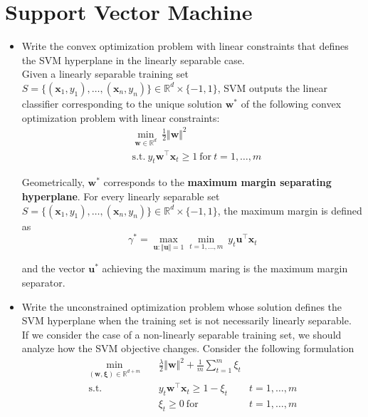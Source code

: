 \newpage
\section{Support Vector Machine}

\begin{itemize}
    
    \item Write the convex optimization problem with linear constraints that defines the SVM hyperplane in the linearly separable case.\\
        
        Given a linearly separable training set $S = \{(\boldsymbol{x}_1, y_1), \dots, (\boldsymbol{x}_n, y_n)\} \in \mathbb{R}^d \times \{-1, 1\}$, SVM outputs the linear classifier corresponding to the unique solution $\boldsymbol{w}^*$ of the following convex optimization problem with linear constraints:
            \begin{align*} 
                & \underset{\boldsymbol{w} \in \mathbb{R}^d}{\min} \ \frac{1}{2} \Vert \boldsymbol{w} \Vert^2 \\
                & \text{s.t.} \ y_t \boldsymbol{w}^\top \boldsymbol{x}_t \geq 1 \ \text{for} \ t = 1, \dots, m 
            \end{align*}

            Geometrically, $\boldsymbol{w}^*$ corresponds to the \textbf{maximum margin separating hyperplane}. For every linearly separable set $S = \{(\boldsymbol{x}_1, y_1), \dots, (\boldsymbol{x}_n, y_n)\} \in \mathbb{R}^d \times \{-1, 1\}$, the maximum margin is defined as 
            $$
            \gamma^* = \underset{\boldsymbol{u} : \Vert \boldsymbol{u} \Vert = 1}{\max} \underset{t = 1, \dots, m}{\min} \ y_t \boldsymbol{u}^\top \boldsymbol{x}_t
            $$ 

            and the vector $\boldsymbol{u}^*$ achieving the maximum maring is the maximum margin separator.

    \item Write the unconstrained optimization problem whose solution defines the SVM hyperplane when the training set is not necessarily linearly separable.\\

        If we consider the case of a non-linearly separable training set, we should analyze how the SVM objective changes. Consider the following formulation
        \begin{align*}
            \underset{(\boldsymbol{w}, \boldsymbol{\xi}) \in \mathbb{R}^{d+m}}{\min} \quad & \frac{\lambda}{2} \Vert \boldsymbol{w} \Vert^2 + \frac{1}{m} \sum_{t = 1}^m \xi_t \\
            \text{s.t.} \quad & y_t \boldsymbol{w}^\top \boldsymbol{x}_t \geq 1 - \xi_t & t = 1, \dots, m \\
            & \xi_t \geq 0 \ \text{for} & t = 1, \dots, m
        \end{align*}


\end{itemize}
